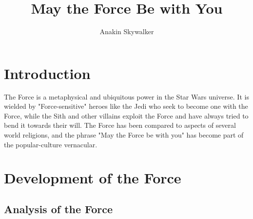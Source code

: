 \documentclass{ruthesis}
\begin{document}
\phd  
\copyrightpage %

\title{May the Force Be with You}  %
\author{Anakin Skywalker}  %


\beforepreface
{}
\dedication{Write down your dedication.}

\tablespage
\figurespage
\afterpreface

\noindent

\chapter{Introduction}
The Force is a metaphysical and ubiquitous power in the Star Wars universe. It is wielded by "Force-sensitive" heroes like the Jedi who seek to become one with the Force, while the Sith and other villains exploit the Force and have always tried to bend it towards their will. The Force has been compared to aspects of several world religions, and the phrase "May the Force be with you" has become part of the popular-culture vernacular.


\chapter{Development of the Force}
\section{Analysis of the Force}
\end{document}
